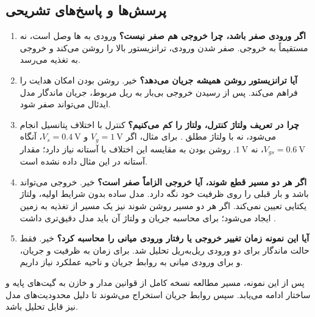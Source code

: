 \subsection{پرسش‌ها و پاسخ‌های تشریحی}
\begin{enumerate}
\item \textbf{اگر ورودی صفر باشد، چرا خروجی هم صفر نیست؟}
ورودی به ها وصل است، نه مستقیماً به خروجی.
صفر شدن ورودی، ترانزیستور بالا را روشن می‌کند و خروجی به تغذیه می‌رسد.
\item \textbf{آیا ترانزیستور روشن همیشه جریان می‌دهد؟}
خیر. روشن بودن امکان هدایت را فراهم می‌کند. پس از رسیدن خروجی بی‌بار
به ریل مربوط، جریان ماندگار مدل ایدئال می‌تواند صفر شود.
\item \textbf{چرا در تعریف ولتاژ کنترل، ولتاژ  را کم می‌کنیم؟}
کنترل با اختلاف پتانسیل انجام می‌شود، نه با ولتاژ مطلق .
برای مثال، اگر \(V_g=\qty{1}{\volt}\) و \(V_s=\qty{0.4}{\volt}\)،
آنگاه \(V_{gs}=\qty{0.6}{\volt}\)، نه \(\qty{1}{\volt}\).
روشن بودن به مقایسه این اختلاف با آستانه نیاز دارد؛ مقدار آستانه در این مثال داده نشده است.
\item \textbf{اگر هر دو مسیر قطع شوند، آیا خروجی الزاماً صفر است؟}
خیر. خروجی می‌تواند  باشد و بار قبلی را روی ظرفیت خود نگه دارد.
مدل ساده بدون شرایط اولیه، ولتاژ یکتایی تعیین نمی‌کند.
اگر هر دو مسیر روشن شوند نیز یک مسیر از تغذیه به زمین ایجاد می‌شود؛
برای محاسبه جریان و ولتاژ آن باید مدل دقیق‌تری داشت
\cite[صفحه چاپی ۱۰]{weste}.
\item \textbf{آیا این نمونه زمان تغییر خروجی یا رفتار ورودی میانی را محاسبه کرد؟}
خیر. فقط حالت ماندگار برای دو ورودی ریل‌به‌ریل تحلیل شد.
برای زمان به ظرفیت و جریان، و برای ورودی میانی به روابط جریان و ناحیه عملکرد نیاز داریم.
\end{enumerate}

پس از این نمونه، مسیر مطالعه نسخه کامل از قوانین مدار و خازن به گیت‌های پایه و
ساختار  ادامه می‌یابد. سپس روابط جریان استخراج می‌شوند تا دلیل محدودیت‌های
مدل  نیز قابل تحلیل باشد.
